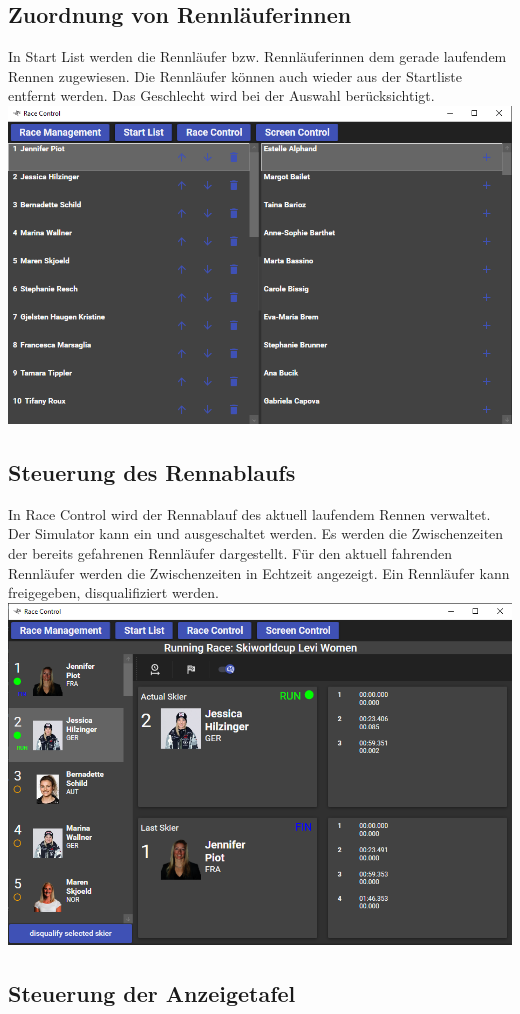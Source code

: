 \documentclass[a4paper, 12pt]{article}
\begin{document}
	\subsection{Zuordnung von Rennläuferinnen}
	In Start List werden die Rennläufer bzw. Rennläuferinnen dem gerade laufendem Rennen zugewiesen. Die Rennläufer können auch wieder aus der Startliste entfernt werden. Das Geschlecht wird bei der Auswahl berücksichtigt.
	\newline
	\includegraphics[width=.7\textwidth]{img/ui_startList.png}
	\newline
	
	\subsection{Steuerung des Rennablaufs}
	In Race Control wird der Rennablauf des aktuell laufendem Rennen verwaltet. Der Simulator kann ein und ausgeschaltet werden. Es werden die Zwischenzeiten der bereits gefahrenen Rennläufer dargestellt. Für den aktuell fahrenden Rennläufer werden die Zwischenzeiten in Echtzeit angezeigt. Ein Rennläufer kann freigegeben, disqualifiziert werden.
	\newline
	\includegraphics[width=.7\textwidth]{img/ui_raceControl.png}
	\newline
	
	
	\subsection{Steuerung der Anzeigetafel}
	
\end{document}
